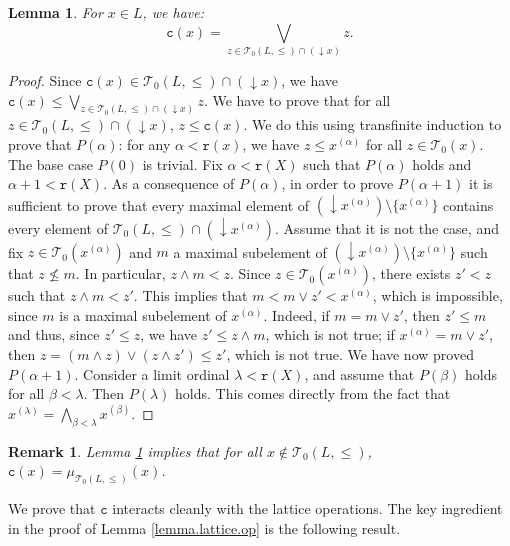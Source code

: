 \documentclass{article}
\newtheorem{lemma}[theorem]{Lemma}
\newtheorem{remark}[theorem]{Remark}
\begin{document}
\begin{lemma}\label{lemma.core.union}
For $x \in L$, we have: 
\[\texttt{c}(x) = \bigvee_{z \in \mathcal{T}_0(L,\le) \cap (\mathop{\downarrow} x)} z.\]
\end{lemma}
 
\begin{proof}
Since $\texttt{c}(x) \in \mathcal{T}_0(L,\le) \cap (\mathop{\downarrow} x)$, we have $\texttt{c}(x) \le \bigvee_{z \in \mathcal{T}_0(L,\le) \cap (\mathop{\downarrow} x)} z$. 
We have to prove that for all $z \in \mathcal{T}_0(L,\le) \cap (\mathop{\downarrow} x)$, $z \le \texttt{c}(x)$. We do this using transfinite induction to prove that $P(\alpha)$: for any $\alpha < \texttt{r}(x)$, we have $z \le x^{(\alpha)}$ for all $z \in \mathcal{T}_0(x)$. The base case  $P(0)$ is trivial. Fix $\alpha < \texttt{r}(X)$ such that $P(\alpha)$ holds and $\alpha+1 < \texttt{r}(X)$. As a consequence of $P(\alpha)$, in order to prove $P(\alpha +1)$ it is sufficient to prove that every maximal element of $(\mathop{\downarrow} x^{(\alpha)}) \setminus \{x^{(\alpha)}\}$ contains every element of $\mathcal{T}_0(L,\le) \cap (\mathop{\downarrow}x^{(\alpha)})$. Assume that it is not the case, and fix $z \in \mathcal{T}_0(x^{(\alpha)})$ and $m$ a maximal subelement of $(\mathop{\downarrow} x^{(\alpha)}) \setminus \{x^{(\alpha)}\}$ such that $z \not \le m$. In particular, 
$z \wedge m < z$. Since $z \in \mathcal{T}_0(x^{(\alpha)})$, there exists $z' < z$ such that $z \wedge m < z'$.
This implies that $m < m \vee z' < x^{(\alpha)}$, which is impossible, since $m$ is a maximal subelement of $x^{(\alpha)}$. Indeed, if $m = m \vee z'$, then $z' \le m$ and thus, since $z' \le z$, we have $z' \le z \wedge m$, which is not true; if $x^{(\alpha)} = m \vee z'$, then $z = (m \wedge z) \vee (z \wedge z') \le z'$, which is not true. 
We have now proved $P(\alpha +1)$. Consider a limit ordinal $\lambda < \texttt{r}(X)$, and assume that $P(\beta)$ holds for all $\beta < \lambda$. Then $P(\lambda)$ holds. This comes directly from the fact that $x^{(\lambda)} = \bigwedge_{\beta < \lambda} x^{(\beta)}$. 
\end{proof}

\begin{remark}
   Lemma \ref{lemma.core.union} implies that for all $x \notin \mathcal{T}_0(L,\le)$, 
$\texttt{c}(x) = \mu_{\mathcal{T}_0(L,\le)}(x)$.
\end{remark}

{
We prove that \(\texttt{c}\) interacts cleanly with the lattice operations. The key ingredient in the proof of Lemma \ref{lemma.lattice.op} is the following result.}
\end{document}
